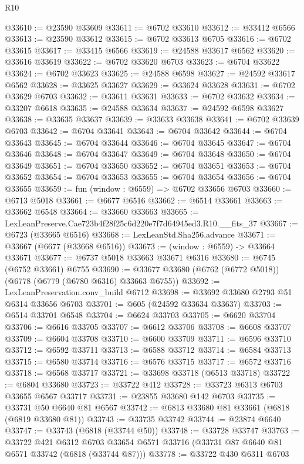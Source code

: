 \begin{lexlean}{R10}
\begin{coremodule}
@33610 := @23590 @33609
@33611 := @6702 @33610
@33612 := @33412 @6566
@33613 := @23590 @33612
@33615 := @6702 @33613 @6705
@33616 := @6702 @33615
@33617 := @33415 @6566
@33619 := @24588 @33617 @6562
@33620 := @33616 @33619
@33622 := @6702 @33620 @6703
@33623 := @6704 @33622
@33624 := @6702 @33623
@33625 := @24588 @6598
@33627 := @24592 @33617 @6562
@33628 := @33625 @33627
@33629 := @33624 @33628
@33631 := @6702 @33629 @6703
@33632 := @33611 @33631
@33633 := @6702 @33632
@33634 := @33207 @6618
@33635 := @24588 @33634
@33637 := @24592 @6598 @33627
@33638 := @33635 @33637
@33639 := @33633 @33638
@33641 := @6702 @33639 @6703
@33642 := @6704 @33641
@33643 := @6704 @33642
@33644 := @6704 @33643
@33645 := @6704 @33644
@33646 := @6704 @33645
@33647 := @6704 @33646
@33648 := @6704 @33647
@33649 := @6704 @33648
@33650 := @6704 @33649
@33651 := @6704 @33650
@33652 := @6704 @33651
@33653 := @6704 @33652
@33654 := @6704 @33653
@33655 := @6704 @33654
@33656 := @6704 @33655
@33659 := fun (window : @6559) => @6702 @33656 @6703
@33660 := @6713 @5018
@33661 := @6677 @6516
@33662 := @6514 @33661
@33663 := @33662 @6548
@33664 := @33660 @33663
@33665 := LexLeanPreserve.Cae723b4f28f25c6d220e7f7d64945ed3.R10.__fits_37
@33667 := @6723 (@33665 @6516)
@33668 := LexLeanStd.Sha256.advance
@33671 := @33667 (@6677 (@33668 @6516))
@33673 := (window : @6559) -> @33664 @33671
@33677 := @6737 @5018 @33663 @33671 @6316
@33680 := @6745 (@6752 @33661) @6755
@33690 := @33677 @33680 (@6762 (@6772 @5018)) (@6778 (@6779 (@6780 @6316) @33663 @6755))
@33692 := LexLeanPreservation.conv_build @6712
@33698 := @33692 @33680 @2793 @51 @6314 @33656 @6703
@33701 := @605 (@24592 @33634 @33637)
@33703 := @6514 @33701 @6548
@33704 := @6624 @33703
@33705 := @6620 @33704
@33706 := @6616 @33705
@33707 := @6612 @33706
@33708 := @6608 @33707
@33709 := @6604 @33708
@33710 := @6600 @33709
@33711 := @6596 @33710
@33712 := @6592 @33711
@33713 := @6588 @33712
@33714 := @6584 @33713
@33715 := @6580 @33714
@33716 := @6576 @33715
@33717 := @6572 @33716
@33718 := @6568 @33717
@33721 := @33698 @33718 (@6513 @33718)
@33722 := @6804 @33680
@33723 := @33722 @412
@33728 := @33723 @6313 @6703 @33655 @6567 @33717
@33731 := @23855 @33680 @142 @6703
@33735 := @33731 @50 @6640 @81 @6567
@33742 := @6813 @33680 @81 @33661 (@6818 (@6819 @33680 @81))
@33743 := @33735 @33742
@33744 := @23874 @6640
@33747 := @33743 (@6818 (@33744 @50))
@33748 := @33728 @33747
@33763 := @33722
    @421
    @6312
    @6703
    @33654
    @6571
    @33716
    (@33731 @87 @6640 @81 @6571 @33742 (@6818 (@33744 @87)))
@33778 := @33722
    @430
    @6311
    @6703

\end{coremodule}
\end{lexlean}
